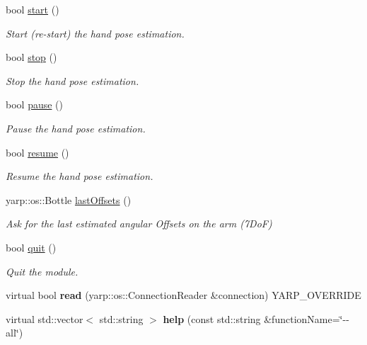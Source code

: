 \begin{DoxyCompactItemize}
\item 
bool \hyperlink{classhandPoseEstimationModule_aec7a8ef91db9cfde42966bdf90f50363}{start} ()
\begin{DoxyCompactList}\small\item\em Start (re-\/start) the hand pose estimation. \end{DoxyCompactList}\item 
bool \hyperlink{classhandPoseEstimationModule_aa742424fe8c42bf74a908ab8eff2b0ab}{stop} ()
\begin{DoxyCompactList}\small\item\em Stop the hand pose estimation. \end{DoxyCompactList}\item 
bool \hyperlink{classhandPoseEstimationModule_ab43685cf6812c7c4c0b1af334f31e94e}{pause} ()
\begin{DoxyCompactList}\small\item\em Pause the hand pose estimation. \end{DoxyCompactList}\item 
bool \hyperlink{classhandPoseEstimationModule_aebfd952abd71f3faf9270efb2a8c5241}{resume} ()
\begin{DoxyCompactList}\small\item\em Resume the hand pose estimation. \end{DoxyCompactList}\item 
yarp\+::os\+::\+Bottle \hyperlink{classhandPoseEstimationModule_a59ac2a028179a7fbdd6571ef889e3d3b}{last\+Offsets} ()
\begin{DoxyCompactList}\small\item\em Ask for the last estimated angular Offsets on the arm (7\+DoF) \end{DoxyCompactList}\item 
bool \hyperlink{classhandPoseEstimationModule_a74ab9a34c397b41e805f5124fb8c2bda}{quit} ()
\begin{DoxyCompactList}\small\item\em Quit the module. \end{DoxyCompactList}\item 
virtual bool {\bfseries read} (yarp\+::os\+::\+Connection\+Reader \&connection) Y\+A\+R\+P\+\_\+\+O\+V\+E\+R\+R\+I\+DE\label{classhandPoseEstimation__IDL_a29990dd4c33d73655d206b0d8e342c83}

\item 
virtual std\+::vector$<$ std\+::string $>$ {\bfseries help} (const std\+::string \&function\+Name=\char`\"{}-\/-\/all\char`\"{})\label{classhandPoseEstimation__IDL_ade8e064ba4c36b3f27c0868c0a7875b8}

\end{DoxyCompactItemize}
